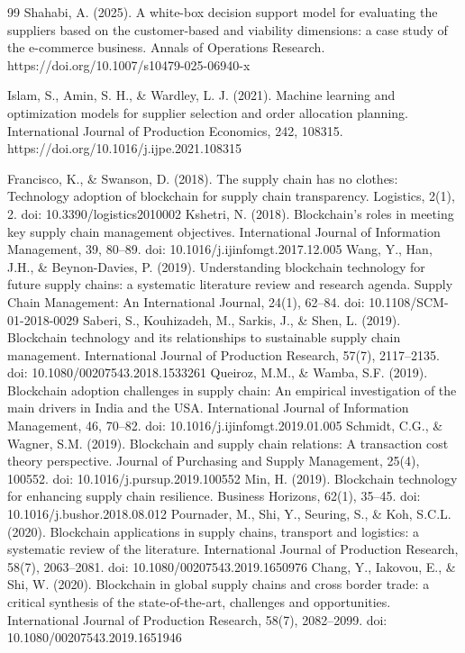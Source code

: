 \documentclass[11pt]{article}
\begin{document}
\begin{thebibliography}{99}
 Shahabi, A. (2025). A white-box decision support model for evaluating the suppliers based on the customer-based and viability dimensions: a case study of the e-commerce business. Annals of Operations Research. https://doi.org/10.1007/s10479-025-06940-x

 Islam, S., Amin, S. H., \& Wardley, L. J. (2021). Machine learning and optimization models for supplier selection and order allocation planning. International Journal of Production Economics, 242, 108315. https://doi.org/10.1016/j.ijpe.2021.108315

 Francisco, K., \& Swanson, D. (2018). The supply chain has no clothes: Technology adoption of blockchain for supply chain transparency. Logistics, 2(1), 2. doi: 10.3390/logistics2010002
 Kshetri, N. (2018). Blockchain's roles in meeting key supply chain management objectives. International Journal of Information Management, 39, 80--89. doi: 10.1016/j.ijinfomgt.2017.12.005
 Wang, Y., Han, J.H., \& Beynon-Davies, P. (2019). Understanding blockchain technology for future supply chains: a systematic literature review and research agenda. Supply Chain Management: An International Journal, 24(1), 62--84. doi: 10.1108/SCM-01-2018-0029
 Saberi, S., Kouhizadeh, M., Sarkis, J., \& Shen, L. (2019). Blockchain technology and its relationships to sustainable supply chain management. International Journal of Production Research, 57(7), 2117--2135. doi: 10.1080/00207543.2018.1533261
 Queiroz, M.M., \& Wamba, S.F. (2019). Blockchain adoption challenges in supply chain: An empirical investigation of the main drivers in India and the USA. International Journal of Information Management, 46, 70--82. doi: 10.1016/j.ijinfomgt.2019.01.005
 Schmidt, C.G., \& Wagner, S.M. (2019). Blockchain and supply chain relations: A transaction cost theory perspective. Journal of Purchasing and Supply Management, 25(4), 100552. doi: 10.1016/j.pursup.2019.100552
 Min, H. (2019). Blockchain technology for enhancing supply chain resilience. Business Horizons, 62(1), 35--45. doi: 10.1016/j.bushor.2018.08.012
 Pournader, M., Shi, Y., Seuring, S., \& Koh, S.C.L. (2020). Blockchain applications in supply chains, transport and logistics: a systematic review of the literature. International Journal of Production Research, 58(7), 2063--2081. doi: 10.1080/00207543.2019.1650976
 Chang, Y., Iakovou, E., \& Shi, W. (2020). Blockchain in global supply chains and cross border trade: a critical synthesis of the state-of-the-art, challenges and opportunities. International Journal of Production Research, 58(7), 2082--2099. doi: 10.1080/00207543.2019.1651946

\end{thebibliography}
\end{document}
